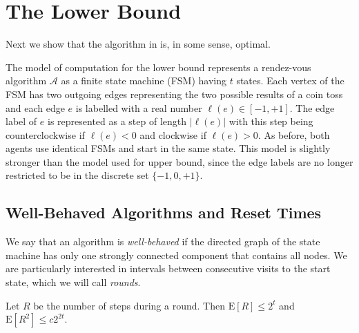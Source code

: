 \documentclass[lotsofwhite]{patmorin}
\newcommand{\E}{\mathrm{E}}
\newcommand{\A}{\mathcal{A}}
\begin{document}
\section{The Lower Bound}

Next we show that the algorithm in  is, in some
sense, optimal.

The model of computation for the lower bound represents a rendez-vous
algorithm $\A$ as a finite state machine (FSM) having $t$ states. Each
vertex of the FSM has two outgoing edges representing the two possible
results of a coin toss and each edge $e$ is labelled with a real
number $\ell(e)\in[-1,+1]$.  The edge label of $e$ is represented as a
step of length $|\ell(e)|$ with this step being counterclockwise if
$\ell(e)<0$ and clockwise if $\ell(e)>0$.  As before, both agents use
identical FSMs and start in the same state. This model is slightly
stronger than the model used for upper bound, since the edge labels
are no longer restricted to be in the discrete set $\{-1,0,+1\}$.

\subsection{Well-Behaved Algorithms and Reset Times}

We say that an algorithm is \emph{well-behaved} if the directed graph
of the state machine has only one strongly connected component that
contains all nodes.  We are particularly interested in intervals
between consecutive visits to the start state, which we will call
\emph{rounds}.

\begin{lem}
Let $R$ be the number of steps during a round. Then 
$\E[R] \le 2^t$ and $\E[R^2] \le c2^{2t}$.
\end{lem}
\end{document}
